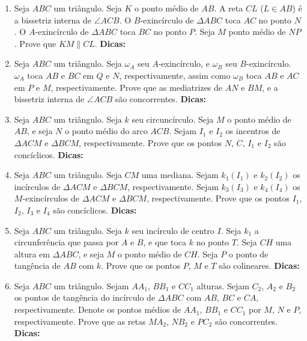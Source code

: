 \documentclass{article}
\newcommand{\dica}{\textbf{Dicas:}}
\newcommand{\iniTri}{Seja $ABC$ um triângulo}
\begin{document}
\begin{multicols}{2}
\begin{enumerate}
    \item \iniTri. Seja $K$ o ponto médio de $AB$. A reta $CL$ ($L\in AB$) é a bissetriz interna de $\angle ACB$. O $B$-exincírculo de $\Delta ABC$ toca $AC$ no ponto $N$. O $A$-exincírculo de $\Delta ABC$ toca $BC$ no ponto $P$. Seja $M$ ponto médio de $NP$. Prove que $KM\parallel CL$. \dica %
    
    \item \iniTri. Seja $\omega_A$ seu $A$-exincírculo, e $\omega_B$ seu $B$-exincírculo. $\omega_A$ toca $AB$ e $BC$ em $Q$ e $N$, respectivamente, assim como $\omega_B$ toca $AB$ e $AC$ em $P$ e $M$, respectivamente. Prove que as mediatrizes de $AN$ e $BM$, e a bissetriz interna de $\angle ACB$ são concorrentes. \dica %
    
    \item \iniTri. Seja $k$ seu circuncírculo. Seja $M$ o ponto médio de $AB$, e seja $N$ o ponto médio do arco $ACB$. Sejam $I_1$ e $I_2$ os incentros de $\Delta ACM$ e $\Delta BCM$, respectivamente. Prove que os pontos $N$, $C$, $I_1$ e $I_2$ são concíclicos. \dica %
    
    \item \iniTri. Seja $CM$ uma mediana. Sejam $k_1(I_1)$ e $k_2(I_2)$ os incírculos de $\Delta ACM$ e $\Delta BCM$, respectivamente. Sejam $k_3(I_3)$ e $k_4(I_4)$ os $M$-exincírculos de $\Delta ACM$ e $\Delta BCM$, respectivamente. Prove que os pontos $I_1$, $I_2$, $I_3$ e $I_4$ são concíclicos. \dica %
    
    \item \iniTri. Seja $k$ seu incírculo de centro $I$. Seja $k_1$ a circunferência que passa por $A$ e $B$, e que toca $k$ no ponto $T$. Seja $CH$ uma altura em $\Delta ABC$, e seja $M$ o ponto médio de $CH$. Seja $P$ o ponto de tangência de $AB$ com $k$. Prove que os pontos $P$, $M$ e $T$ são colineares. \dica %
    
    \item \iniTri. Sejam $AA_1$, $BB_1$ e $CC_1$ alturas. Sejam $C_2$, $A_2$ e $B_2$ os pontos de tangência do incírculo de $\Delta ABC$ com $AB$, $BC$ e $CA$, respectivamente. Denote os pontos médios de $AA_1$, $BB_1$ e $CC_1$ por $M$, $N$ e $P$, respectivamente. Prove que as retas $MA_2$, $NB_2$ e $PC_2$ são concorrentes. \dica %
    

\end{enumerate}
\end{multicols}
\end{document}

